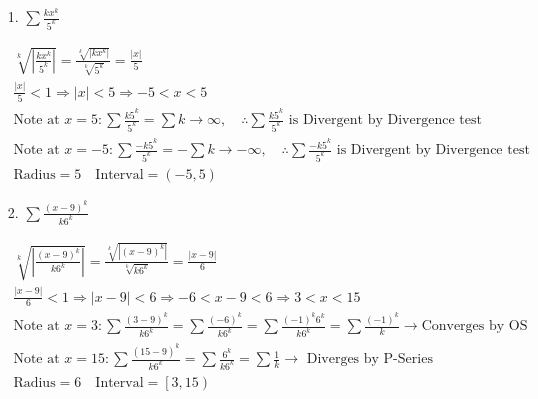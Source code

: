     \begin{itemize}
        \item [1.] $\sum\frac{kx^{k}}{5^{k}}$
        \\
        \begin{mdframed}
            \begin{equation*}
                \begin{gathered}
                    \sqrt[k]{\left|\frac{kx^{k}}{5^{k}}\right|} =
                \frac{\sqrt[k]{|kx^{k}|}}{\sqrt[k]{5^{k}}} =
                \frac{|x|}{5}                                                   \\
                \frac{|x|}{5} < 1 \Rightarrow |x| < 5 \Rightarrow -5 < x < 5    \\
                \text{Note at } x = 5: \sum\frac{k5^{k}}{5^{k}} = \sum k \rightarrow \infty, \quad
                \therefore \sum\frac{k5^{k}}{5^{k}} \text{ is Divergent by Divergence test}        
                \\
                \text{Note at } x = -5: \sum\frac{-k5^{k}}{5^{k}} = -\sum k \rightarrow -\infty, \quad
                \therefore \sum\frac{-k5^{k}}{5^{k}} \text{ is Divergent by Divergence test}        
                \\
                \text{Radius} = 5 \quad \text{Interval} = \left(-5,5\right)
                \end{gathered}
            \end{equation*}
        \end{mdframed}

        \item [2.] $\sum\frac{(x-9)^{k}}{k6^{k}}$
        \\
        \begin{mdframed}
            \begin{equation*}
                \begin{gathered}
                    \sqrt[k]{\left|\frac{(x-9)^{k}}{k6^{k}}\right|} =
                    \frac{\sqrt[k]{|(x-9)^{k}|}}{\sqrt[k]{k6^{k}}} =
                    \frac{|x-9|}{6}                                         \\
                    \frac{|x-9|}{6} < 1 \Rightarrow |x-9| < 6 \Rightarrow 
                    -6 < x-9 < 6 \Rightarrow 3 < x < 15                     \\
                    \text{Note at } x=3: \sum\frac{(3-9)^{k}}{k6^{k}} =
                    \sum\frac{(-6)^{k}}{k6^{k}} = 
                    \sum\frac{(-1)^{k}6^{k}}{k6^{k}} =
                    \sum\frac{(-1)^{k}}{k} \rightarrow 
                    \text{Converges by OS}                                  \\
                    \text{Note at } x=15: \sum\frac{(15-9)^{k}}{k6^{k}} =
                    \sum\frac{6^{k}}{k6^{k}} = 
                    \sum\frac{1}{k} \rightarrow \text{ Diverges by P-Series}\\
                    \text{Radius} = 6 \quad \text{Interval} = \left[3,15\right)
                \end{gathered}
            \end{equation*}
        \end{mdframed}


\end{itemize}
